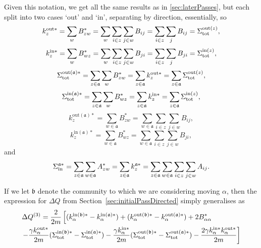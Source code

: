 \documentclass{article}
\begin{document}
Given this notation, we get all the same results as in \ref{sec:laterPasses}, but 
each split into two cases `out' and `in', separating by direction, essentially, so
\newcommand{\dkinStar}[1]{k_{#1}^{\text{in} *}}
\newcommand{\dkoutStar}[1]{k_{#1}^{\text{out} *}}
\begin{equation}
\dkoutStar{z} = \sum_w{B_{zw}^*} = \sum_w\sum_{i \in z}\sum_{j \in w}B_{ij} = \sum_{i \in z}\sum_jB_{ij} = \doutStot{z},
\end{equation}
\begin{equation}
\dkinStar{z}  = \sum_w{B_{wz}^*} = \sum_w\sum_{i \in z}\sum_{j \in w}B_{ji} = \sum_{i \in z}\sum_jB_{ji} = \dinStot{z},
\end{equation}
\newcommand{\dinStotStar}[1]{\Sigma_{\text{tot}}^{\text{in}(#1) *}}
\newcommand{\doutStotStar}[1]{\Sigma_{\text{tot}}^{\text{out}(#1) *}}
\begin{equation}
	\doutStotStar{\mathfrak{a}} = \sum_{z \in \mathfrak{a}}\sum_{w}B_{zw}^* = \sum_{z \in \mathfrak{a}}\dkoutStar{z} = \sum_{z \in \mathfrak{a}}\doutStot{z},
\end{equation}
\begin{equation}
	\dinStotStar{\mathfrak{a}}  = \sum_{z \in \mathfrak{a}}\sum_{w}B_{wz}^* = \sum_{z \in \mathfrak{a}}\dkinStar{z}  = \sum_{z \in \mathfrak{a}}\dinStot{z},
\end{equation}
\newcommand{\dinkinStar}[2]{k_{#1}^{\text{in}(#2) *}}
\newcommand{\doutkinStar}[2]{k_{#1}^{\text{out}(#2) *}}
\begin{equation}
	\doutkinStar{z}{\mathfrak{a}} = \sum_{w \in \mathfrak{a}}{B_{zw}^*} = \sum_{w \in \mathfrak{a}}{\sum_{i \in z}\sum_{j \in w}B_{ij}},
\end{equation}
\begin{equation}
	\dinkinStar{z}{\mathfrak{a}}  = \sum_{w \in \mathfrak{a}}{B_{wz}^*} = \sum_{w \in \mathfrak{a}}{\sum_{i \in z}\sum_{j \in w}B_{ji}},
\end{equation}
and
\begin{equation}
\Sigma_{\text{in}}^{\mathfrak{a} *} = \sum_{z \in \mathfrak{a}}\sum_{w \in \mathfrak{a}}A_{zw}^* = \sum_{z \in \mathfrak{a}}k_{z}^{\mathfrak{a} *} = \sum_{z \in \mathfrak{a}}\sum_{w \in \mathfrak{a}}{\sum_{i \in z}\sum_{j \in w}A_{ij}}.
\end{equation}

If we let $\mathfrak{b}$ denote the community to which we are considering moving $\alpha$,
then the expression for $\Delta Q$ from Section~\ref{sec:initialPassDirected} simply generalises as
\begin{align*}
\Delta Q^{(3)} &= \frac{2}{2m}\left[ (\dinkinStar{\alpha}{\mathfrak{b}}-\dinkinStar{\alpha}{\mathfrak{a}}) + (\doutkinStar{\alpha}{\mathfrak{b}}-\doutkinStar{\alpha}{\mathfrak{a}}) + 2B_{\alpha\alpha}^* \right. \\
& \hspace{-1cm} \left.
- \frac{\gamma\dkoutStar{\alpha}}{2m} (\dinStotStar{\mathfrak{b}}-\dinStotStar{\mathfrak{a}}) - \frac{\gamma\dkinStar{\alpha}}{2m} (\doutStotStar{\mathfrak{b}} - \doutStotStar{\mathfrak{a}}) - \frac{2\gamma\dkinStar{\alpha}\dkoutStar{\alpha}}{2m} \right]
\end{align*}
\end{document}
